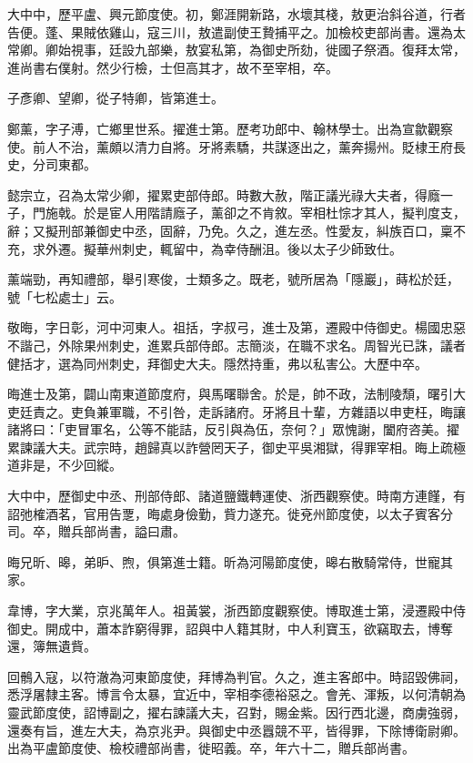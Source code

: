 \begin{pinyinscope}
 大中中，歷平盧、興元節度使。初，鄭涯開新路，水壞其棧，敖更治斜谷道，行者告便。蓬、果賊依雞山，寇三川，敖遣副使王贄捕平之。加檢校吏部尚書。還為太常卿。卿始視事，廷設九部樂，敖宴私第，為御史所劾，徙國子祭酒。復拜太常，進尚書右僕射。然少行檢，士但高其才，故不至宰相，卒。



 子彥卿、望卿，從子特卿，皆第進士。



 鄭薰，字子溥，亡鄉里世系。擢進士第。歷考功郎中、翰林學士。出為宣歙觀察使。前人不治，薰頗以清力自將。牙將素驕，共謀逐出之，薰奔揚州。貶棣王府長史，分司東都。



 懿宗立，召為太常少卿，擢累吏部侍郎。時數大赦，階正議光祿大夫者，得廕一子，門施戟。於是宦人用階請廕子，薰卻之不肯敘。宰相杜悰才其人，擬判度支，辭；又擬刑部兼御史中丞，固辭，乃免。久之，進左丞。性愛友，糾族百口，稟不充，求外遷。擬華州刺史，輒留中，為幸侍酬沮。後以太子少師致仕。



 薰端勁，再知禮部，舉引寒俊，士類多之。既老，號所居為「隱巖」，蒔松於廷，號「七松處士」云。



 敬晦，字日彰，河中河東人。祖括，字叔弓，進士及第，遷殿中侍御史。楊國忠惡不諧己，外除果州刺史，進累兵部侍郎。志簡淡，在職不求名。周智光已誅，議者健括才，選為同州刺史，拜御史大夫。隱然持重，弗以私害公。大歷中卒。



 晦進士及第，闢山南東道節度府，與馬曙聯舍。於是，帥不政，法制陵頹，曙引大吏廷責之。吏負兼軍職，不引咎，走訴諸府。牙將且十輩，方雜語以申吏枉，晦讓諸將曰：「吏冒軍名，公等不能詰，反引與為伍，奈何？」眾愧謝，闔府咨美。擢累諫議大夫。武宗時，趙歸真以詐營罔天子，御史平吳湘獄，得罪宰相。晦上疏極道非是，不少回縱。



 大中中，歷御史中丞、刑部侍郎、諸道鹽鐵轉運使、浙西觀察使。時南方連饉，有詔弛榷酒茗，官用告覂，晦處身儉勤，貲力遂充。徙兗州節度使，以太子賓客分司。卒，贈兵部尚書，謚曰肅。



 晦兄昕、暤，弟昈、煦，俱第進士籍。昕為河陽節度使，暤右散騎常侍，世寵其家。



 韋博，字大業，京兆萬年人。祖黃裳，浙西節度觀察使。博取進士第，浸遷殿中侍御史。開成中，蕭本詐窮得罪，詔與中人籍其財，中人利寶玉，欲竊取去，博奪還，簿無遺貲。



 回鶻入寇，以符澈為河東節度使，拜博為判官。久之，進主客郎中。時詔毀佛祠，悉浮屠隸主客。博言令太暴，宜近中，宰相李德裕惡之。會羌、渾叛，以何清朝為靈武節度使，詔博副之，擢右諫議大夫，召對，賜金紫。因行西北邊，商虜強弱，還奏有旨，進左大夫，為京兆尹。與御史中丞囂競不平，皆得罪，下除博衛尉卿。出為平盧節度使、檢校禮部尚書，徙昭義。卒，年六十二，贈兵部尚書。




\end{pinyinscope}
